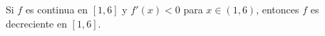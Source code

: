 \item Si $f$ es continua en $[1, 6]$ y $f'(x) < 0$ para $x \in (1, 6)$, entonces $f$ es decreciente en $[1, 6]$.
